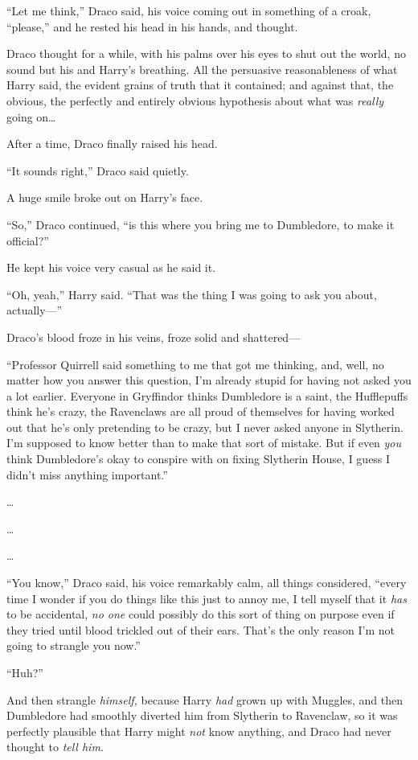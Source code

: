 “Let me think,” Draco said, his voice coming out in something of a croak, “please,” and he rested his head in his hands, and thought.

\later

Draco thought for a while, with his palms over his eyes to shut out the world, no sound but his and Harry’s breathing. All the persuasive reasonableness of what Harry said, the evident grains of truth that it contained; and against that, the obvious, the perfectly and entirely obvious hypothesis about what was \emph{really} going on…

After a time, Draco finally raised his head.

“It sounds right,” Draco said quietly.

A huge smile broke out on Harry’s face.

“So,” Draco continued, “is this where you bring me to Dumbledore, to make it official?”

He kept his voice very casual as he said it.

“Oh, yeah,” Harry said. “That was the thing I was going to ask you about, actually—”

Draco’s blood froze in his veins, froze solid and shattered—

“Professor Quirrell said something to me that got me thinking, and, well, no matter how you answer this question, I’m already stupid for having not asked you a lot earlier. Everyone in Gryffindor thinks Dumbledore is a saint, the Hufflepuffs think he’s crazy, the Ravenclaws are all proud of themselves for having worked out that he’s only pretending to be crazy, but I never asked anyone in Slytherin. I’m supposed to know better than to make that sort of mistake. But if even \emph{you} think Dumbledore’s okay to conspire with on fixing Slytherin House, I guess I didn’t miss anything important.”

…

…

…

“You know,” Draco said, his voice remarkably calm, all things considered, “every time I wonder if you do things like this just to annoy me, I tell myself that it \emph{has} to be accidental, \emph{no one} could possibly do this sort of thing on purpose even if they tried until blood trickled out of their ears. That’s the only reason I’m not going to strangle you now.”

“Huh?”

And then strangle \emph{himself,} because Harry \emph{had} grown up with Muggles, and then Dumbledore had smoothly diverted him from Slytherin to Ravenclaw, so it was perfectly plausible that Harry might \emph{not} know anything, and Draco had never thought to \emph{tell him.}

